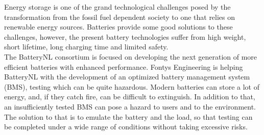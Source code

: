 Energy storage is one of the grand technological challenges posed by the transformation from the fossil fuel dependent society to one that relies on renewable energy sources. Batteries provide some good solutions to these challenges, however, the present battery technologies suffer from high weight, short lifetime, long charging time and limited safety. \\
The BatteryNL consortium is focused on developing the next generation of more efficient batteries with enhanced performance. Fontys Engineering is helping BatteryNL with the development of an optimized battery management system (BMS), testing which can be quite hazardous. Modern batteries can store a lot of energy, and, if they catch fire, can be difficult to extinguish. In addition to that, an insufficiently tested BMS can pose a hazard to users and to the environment. \\
The solution to that is to emulate the battery and the load, so that testing can be completed under a wide range of conditions without taking excessive risks. \\
